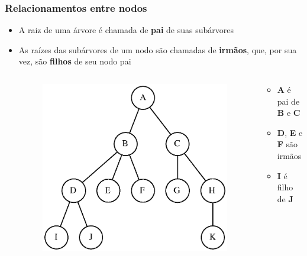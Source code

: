 \documentclass[aspectratio=169]{beamer}
\begin{document}
\begin{frame}\frametitle{Relacionamentos entre nodos}
\begin{itemize}
	\item A raiz de uma árvore é chamada de \textbf{pai} de suas subárvores
	\item As raízes das subárvores de um nodo são chamadas de \textbf{irmãos}, que, por sua vez, são \textbf{filhos} de seu nodo pai
\begin{columns}[T]
\begin{column}{0.5\linewidth}
\begin{figure}[h]
	\centering
	\includegraphics[height=0.55\paperheight]{imagens/arvore3.eps}
\end{figure}
\end{column}
\begin{column}{0.5\linewidth}
\begin{itemize}
	\item \textbf{A} é pai de \textbf{B} e \textbf{C}
	\item \textbf{D}, \textbf{E} e \textbf{F} são irmãos
	\item \textbf{I} é filho de \textbf{J}
\end{itemize}
\end{column}
\end{columns}
\end{itemize}
\end{frame}
\end{document}
